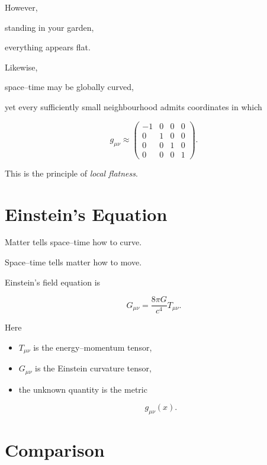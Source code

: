 \documentclass[12pt,a4paper]{article}
\theoremstyle{notespace}
\begin{document}
However,

standing in your garden,

everything appears flat.

Likewise,

space--time may be globally curved,

yet every sufficiently small neighbourhood admits coordinates in which

\[
g_{\mu\nu}
\approx
\begin{pmatrix}
	-1&0&0&0\\
	0&1&0&0\\
	0&0&1&0\\
	0&0&0&1
\end{pmatrix}.
\]

This is the principle of \emph{local flatness}.


\section{Einstein's Equation}

Matter tells space--time how to curve.

Space--time tells matter how to move.

Einstein's field equation is

\[
G_{\mu\nu}
=
\frac{8\pi G}{c^4}
T_{\mu\nu}.
\]

Here

\begin{itemize}
	\item
	\(T_{\mu\nu}\) is the energy--momentum tensor,
	
	\item
	\(G_{\mu\nu}\) is the Einstein curvature tensor,
	
	\item
	the unknown quantity is the metric
	
	\[
	g_{\mu\nu}(x).
	\]
\end{itemize}


\section{Comparison}

\renewcommand{\arraystretch}{1.4}
\end{document}
